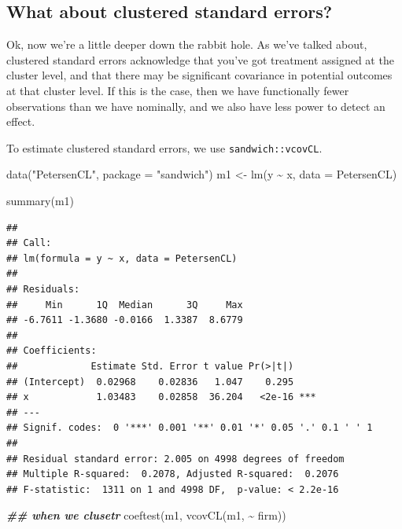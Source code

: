 \documentclass[
]{article}
\newenvironment{Shaded}{\begin{snugshade}}{\end{snugshade}}
\newcommand{\AttributeTok}[1]{\textcolor[rgb]{0.77,0.63,0.00}{#1}}
\newcommand{\DocumentationTok}[1]{\textcolor[rgb]{0.56,0.35,0.01}{\textbf{\textit{#1}}}}
\newcommand{\FunctionTok}[1]{\textcolor[rgb]{0.00,0.00,0.00}{#1}}
\newcommand{\NormalTok}[1]{#1}
\newcommand{\OtherTok}[1]{\textcolor[rgb]{0.56,0.35,0.01}{#1}}
\newcommand{\SpecialCharTok}[1]{\textcolor[rgb]{0.00,0.00,0.00}{#1}}
\newcommand{\StringTok}[1]{\textcolor[rgb]{0.31,0.60,0.02}{#1}}
\begin{document}
\hypertarget{what-about-clustered-standard-errors}{%
\subsection{What about clustered standard errors?}\label{what-about-clustered-standard-errors}}

Ok, now we're a little deeper down the rabbit hole. As we've talked about, clustered standard errors acknowledge that you've got treatment assigned at the cluster level, and that there may be significant covariance in potential outcomes at that cluster level. If this is the case, then we have functionally fewer observations than we have nominally, and we also have less power to detect an effect.

To estimate clustered standard errors, we use \texttt{sandwich::vcovCL}.

\begin{Shaded}
\begin{Highlighting}[]
\FunctionTok{data}\NormalTok{(}\StringTok{"PetersenCL"}\NormalTok{, }\AttributeTok{package =} \StringTok{"sandwich"}\NormalTok{)}
\NormalTok{m1 }\OtherTok{\textless{}{-}} \FunctionTok{lm}\NormalTok{(y }\SpecialCharTok{\textasciitilde{}}\NormalTok{ x, }\AttributeTok{data =}\NormalTok{ PetersenCL)}

\FunctionTok{summary}\NormalTok{(m1)}
\end{Highlighting}
\end{Shaded}

\begin{verbatim}
## 
## Call:
## lm(formula = y ~ x, data = PetersenCL)
## 
## Residuals:
##     Min      1Q  Median      3Q     Max 
## -6.7611 -1.3680 -0.0166  1.3387  8.6779 
## 
## Coefficients:
##             Estimate Std. Error t value Pr(>|t|)    
## (Intercept)  0.02968    0.02836   1.047    0.295    
## x            1.03483    0.02858  36.204   <2e-16 ***
## ---
## Signif. codes:  0 '***' 0.001 '**' 0.01 '*' 0.05 '.' 0.1 ' ' 1
## 
## Residual standard error: 2.005 on 4998 degrees of freedom
## Multiple R-squared:  0.2078, Adjusted R-squared:  0.2076 
## F-statistic:  1311 on 1 and 4998 DF,  p-value: < 2.2e-16
\end{verbatim}

\begin{Shaded}
\begin{Highlighting}[]
\DocumentationTok{\#\# when we clusetr}
\FunctionTok{coeftest}\NormalTok{(m1, }\FunctionTok{vcovCL}\NormalTok{(m1, }\SpecialCharTok{\textasciitilde{}}\NormalTok{ firm))}
\end{Highlighting}
\end{Shaded}
\end{document}
